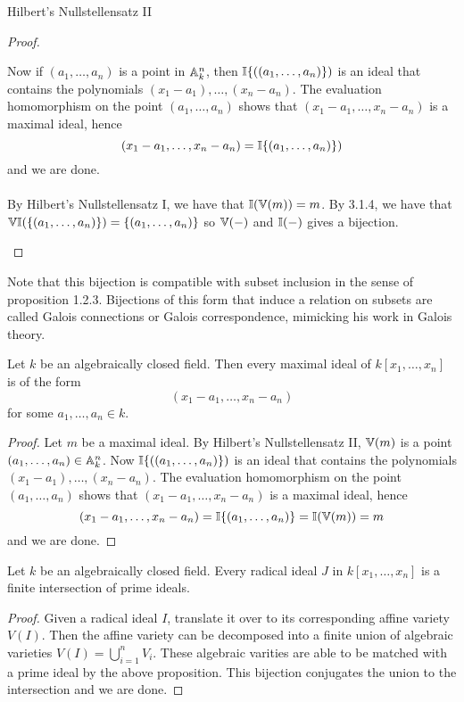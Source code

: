 \documentclass[a4paper]{article}
\begin{document}
\begin{thm}{Hilbert's Nullstellensatz II}{}
\begin{proof}
\begin{itemize}
Now if $(a_1,\dots,a_n)$ is a point in $\mathbb{A}_k^n$, then $\mathbb{I}\{((a_1,\dots,a_n)\})$ is an ideal that contains the polynomials $(x_1-a_1),\dots,(x_n-a_n)$. The evaluation homomorphism on the point $(a_1,\dots,a_n)$ shows that $(x_1-a_1,\dots,x_n-a_n)$ is a maximal ideal, hence $$(x_1-a_1,\dots,x_n-a_n)=\mathbb{I}\{(a_1,\dots,a_n)\})$$ and we are done. \\~\\

By Hilbert's Nullstellensatz I, we have that $\mathbb{I}(\mathbb{V}(m))=m$. By 3.1.4, we have that $\mathbb{V}\mathbb{I}(\{(a_1,\dots,a_n)\})=\{(a_1,\dots,a_n)\}$ so $\mathbb{V}(-)$ and $\mathbb{I}(-)$ gives a bijection. 
\end{itemize}
\end{proof}
\end{thm}

Note that this bijection is compatible with subset inclusion in the sense of proposition 1.2.3. Bijections of this form that induce a relation on subsets are called Galois connections or Galois correspondence, mimicking his work in Galois theory. 

\begin{prp}{}{} Let $k$ be an algebraically closed field. Then every maximal ideal of $k[x_1,\dots,x_n]$ is of the form $$(x_1-a_1,\dots,x_n-a_n)$$ for some $a_1,\dots,a_n\in k$. \tcbline
\begin{proof}
Let $m$ be a maximal ideal. By Hilbert's Nullstellensatz II, $\mathbb{V}(m)$ is a point $(a_1,\dots,a_n)\in\mathbb{A}_k^n$. Now $\mathbb{I}\{((a_1,\dots,a_n)\})$ is an ideal that contains the polynomials $(x_1-a_1),\dots,(x_n-a_n)$. The evaluation homomorphism on the point $(a_1,\dots,a_n)$ shows that $(x_1-a_1,\dots,x_n-a_n)$ is a maximal ideal, hence $$(x_1-a_1,\dots,x_n-a_n)=\mathbb{I}\{(a_1,\dots,a_n)\}=\mathbb{I}(\mathbb{V}(m))=m$$ and we are done. 
\end{proof}
\end{prp}

\begin{prp}{}{} Let $k$ be an algebraically closed field. Every radical ideal $J$ in $k[x_1,\dots,x_n]$ is a finite intersection of prime ideals. \tcbline
\begin{proof}
Given a radical ideal $I$, translate it over to its corresponding affine variety $V(I)$. Then the affine variety can be decomposed into a finite union of algebraic varieties $V(I)=\bigcup_{i=1}^nV_i$. These algebraic varities are able to be matched with a prime ideal by the above proposition. This bijection conjugates the union to the intersection and we are done. 
\end{proof}
\end{prp}
\end{document}
